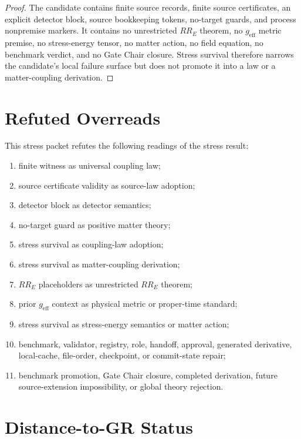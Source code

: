 \documentclass[11pt]{article}
\begin{document}
\begin{proof}
The candidate contains finite source records, finite source certificates, an
explicit detector block, source bookkeeping tokens, no-target guards, and
process nonpremise markers. It contains no unrestricted \(RR_E\) theorem, no
\(g_{\mathrm{eff}}\) metric premise, no stress-energy tensor, no matter action,
no field equation, no benchmark verdict, and no Gate Chair closure. Stress
survival therefore narrows the candidate's local failure surface but does not
promote it into a law or a matter-coupling derivation.
\end{proof}

\section{Refuted Overreads}

This stress packet refutes the following readings of the stress result:

\begin{enumerate}[leftmargin=*]
  \item finite witness as universal coupling law;
  \item source certificate validity as source-law adoption;
  \item detector block as detector semantics;
  \item no-target guard as positive matter theory;
  \item stress survival as coupling-law adoption;
  \item stress survival as matter-coupling derivation;
  \item \(RR_E\) placeholders as unrestricted \(RR_E\) theorem;
  \item prior \(g_{\mathrm{eff}}\) context as physical metric or proper-time
        standard;
  \item stress survival as stress-energy semantics or matter action;
  \item benchmark, validator, registry, role, handoff, approval, generated
        derivative, local-cache, file-order, checkpoint, or commit-state repair;
  \item benchmark promotion, Gate Chair closure, completed derivation, future
        source-extension impossibility, or global theory rejection.
\end{enumerate}

\section{Distance-to-GR Status}
\end{document}
